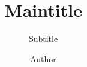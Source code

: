\documentclass{thesis}
\title{Maintitle}
\subtitle{Subtitle}
\author{Author}
\institute{Institute}
\begin{document}

\cleardoublepage

\tableofcontents
\cleardoublepage

\startTextChapters

\printglossaries
\clearpage


\clearpage

\clearpage

\clearpage

\clearpage

\clearpage


\clearpage

\clearpage

\clearpage
\end{document}
